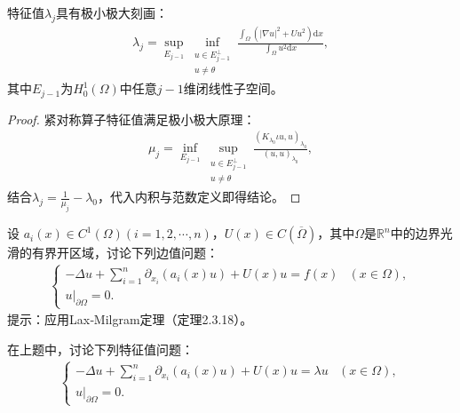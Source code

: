 \documentclass[../../main.tex]{subfiles}%
\begin{document}
\begin{proposition}
特征值$\lambda_j$具有极小极大刻画：
\begin{align*}
\lambda_j=\sup_{E_{j-1}}\inf_{\substack{u\in E_{j-1}^\perp\\u\neq\theta}}\frac{\int_{\Omega}\left(|\nabla u|^2+Uu^2\right)\mathrm{d}x}{\int_{\Omega}u^2\mathrm{d}x},
\end{align*}
其中$E_{j-1}$为$H_0^1(\Omega)$中任意$j-1$维闭线性子空间。
\end{proposition}
\begin{proof}

紧对称算子特征值满足极小极大原理：
\begin{align*}
\mu_j=\inf_{E_{j-1}}\sup_{\substack{u\in E_{j-1}^\perp\\u\neq\theta}}\frac{(K_{\lambda_0}\iota u,u)_{\lambda_0}}{(u,u)_{\lambda_0}},
\end{align*}
结合$\lambda_j=\frac{1}{\mu_j}-\lambda_0$，代入内积与范数定义即得结论。

\end{proof}

\begin{example}
设 $a_i(x) \in C^1(\Omega)(i=1,2,\cdots,n)$，$U(x) \in C(\overline{\Omega})$，其中$\Omega$是$\mathbb{R}^n$中的边界光滑的有界开区域，讨论下列边值问题：
\begin{align*}
\begin{cases}
-\Delta u + \sum\limits_{i=1}^{n} \partial_{x_i}(a_i(x)u) + U(x)u = f(x) & (x \in \Omega), \\
u\big|_{\partial\Omega} = 0.
\end{cases}
\end{align*}
提示：应用Lax‑Milgram定理（定理2.3.18）。
\end{example}

\begin{example}
在上题中，讨论下列特征值问题：
\begin{align*}
\begin{cases}
-\Delta u + \sum\limits_{i=1}^{n} \partial_{x_i}(a_i(x)u) + U(x)u = \lambda u & (x \in \Omega), \\
u\big|_{\partial\Omega} = 0.
\end{cases}
\end{align*}
\end{example}
\end{document}
